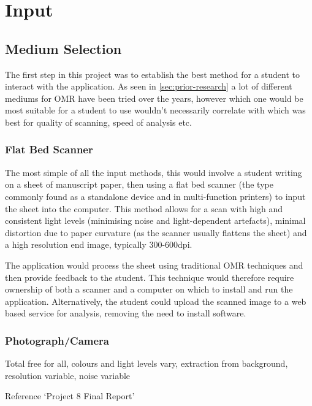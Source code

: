 \section{Input}

\subsection{Medium Selection}
\label{sec:medium-selection}

The first step in this project was to establish the best method for a student to interact with the application. As seen in \cref{sec:prior-research} a lot of different mediums for OMR have been tried over the years, however which one would be most suitable for a student to use wouldn't necessarily correlate with which was best for quality of scanning, speed of analysis etc.

\subsubsection{Flat Bed Scanner}

The most simple of all the input methods, this would involve a student writing on a sheet of manuscript paper, then using a flat bed scanner (the type commonly found as a standalone device and in multi-function printers) to input the sheet into the computer. This method allows for a scan with high and consistent light levels (minimising noise and light-dependent artefacts), minimal distortion due to paper curvature (as the scanner usually flattens the sheet) and a high resolution end image, typically 300-600dpi.

The application would process the sheet using traditional OMR techniques and then provide feedback to the student. This technique would therefore require ownership of both a scanner and a computer on which to install and run the application. Alternatively, the student could upload the scanned image to a web based service for analysis, removing the need to install software.

\subsubsection{Photograph/Camera}


Total free for all, colours and light levels vary, extraction from background, resolution variable, noise variable

Reference `Project 8 Final Report'

